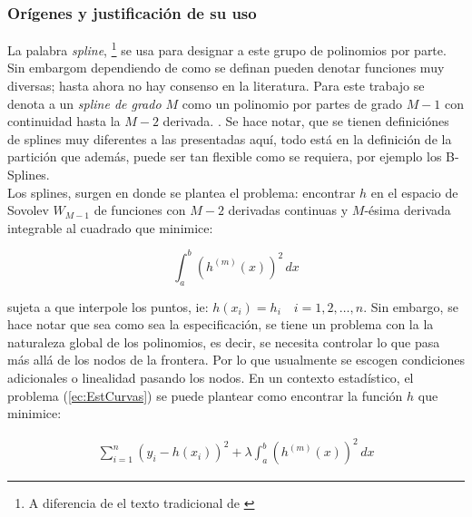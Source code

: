 \documentclass[../Main/Main.tex]{subfiles}
\begin{document}
\subsubsection{Orígenes y justificación de su uso}
La palabra \textit{spline}, \footnote{A diferencia de el texto tradicional de \autocite{deboor1978splines}} se usa para designar a este grupo de polinomios por parte. Sin embargom dependiendo de como se definan pueden denotar funciones muy diversas; hasta ahora no hay consenso en la literatura. Para este trabajo se denota a un \textit{spline de grado $M$} como un polinomio por partes de grado $M-1$ con continuidad hasta la $M-2$ derivada. \autocite{wasserman2007all}. Se hace notar, que se tienen definiciónes de splines muy diferentes a las presentadas aquí, todo está en la definición de la partición que además, puede ser tan flexible como se requiera, por ejemplo los B-Splines.\\

Los splines, surgen en \autocite{schoenberg1964spline} donde se plantea el problema: encontrar $h$ en el espacio de Sovolev $W_{M-1}$ de funciones con $M-2$ derivadas continuas y $M$-ésima derivada integrable al cuadrado que minimice:

$$\int_a^b(h^{(m)}(x))^2\,dx$$ 

sujeta a que interpole los puntos, ie: $h(x_i) = h_i \quad i = 1,2,\ldots,n$. Sin embargo, se hace notar que sea como sea la especificación, se tiene un problema con la la naturaleza global de los polinomios, es decir, se necesita controlar lo que pasa más allá de los nodos de la frontera. Por lo que usualmente se escogen condiciones adicionales o linealidad pasando los nodos. En un contexto estadístico, el problema (\ref{ec:EstCurvas}) se puede plantear como encontrar la función $h$ que minimice:

\begin{align}
	\sum_{i=1}^n(y_i - h(x_i))^2 + \lambda\int_a^b (h^{(m)}(x))^2 \, dx \label{ec:SplinesConRegularizacion}
\end{align}
\end{document}
